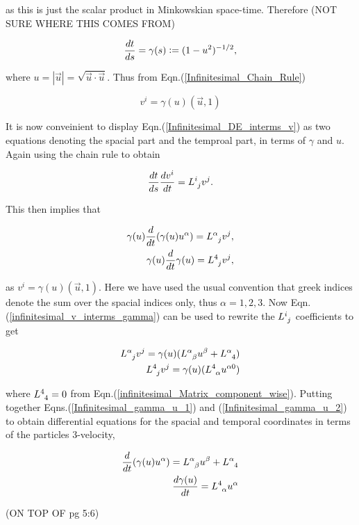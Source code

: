 \noindent as this is just the scalar product in Minkowskian space-time. Therefore (NOT SURE WHERE THIS COMES FROM)

\begin{equation*}
\frac{dt}{ds} = \gamma (s) \vcentcolon = (1-u^2)^{-1/2},
\end{equation*}

\noindent where $u = |\vec{u}| = \sqrt{\vec{u} \cdot \vec{u}}$. Thus from Eqn.(\ref{Infinitesimal_Chain_Rule})

\begin{equation}\label{infinitesimal_v_interms_gamma}
v^i = \gamma(u) (\vec{u}, 1)
\end{equation}

\noindent It is now conveinient to display Eqn.(\ref{Infinitesimal_DE_interms_v}) as two equations denoting the spacial part and the temproal part, in terms of $\gamma$ and $u$. Again using the chain rule to obtain

\begin{equation*} 
\frac{dt}{ds} \frac{dv^i}{dt} = \tensor{L}{^{i}_{j}}v^j. 
\end{equation*} 

\noindent This then implies that 

\begin{eqnarray}\label{Infinitesimal_gamma_u_1}
\gamma(u) \frac{d}{dt} (\gamma(u) u^{\alpha}) = \tensor{L}{^{\alpha}_{j}} v^j, \\\nonumber
\gamma(u) \frac{d}{dt} \gamma(u) = \tensor{L}{^{4}_{j}} v^j,
\end{eqnarray}

\noindent as $v^i = \gamma(u)(\vec{u},1)$. Here we have used the usual convention that greek indices denote the sum over the spacial indices only, thus $\alpha = 1,2,3$. Now Eqn.(\ref{infinitesimal_v_interms_gamma}) can be used to rewrite the $\tensor{L}{^{i}_{j}}$ coefficients to get

\begin{eqnarray}\label{Infinitesimal_gamma_u_2}
\tensor{L}{^{\alpha}_{j}} v^j = \gamma(u) (\tensor{L}{^{\alpha}_{\beta}} u^{\beta} + \tensor{L}{^{\alpha}_4}) \\ \nonumber
\tensor{L}{^{4}_{j}} v^j = \gamma(u) (\tensor{L}{^{4}_{\alpha}} u^{\alpha0})
\end{eqnarray} 

\noindent where $\tensor{L}{^{4}_{4}} = 0$ from Eqn.(\ref{infinitesimal_Matrix_component_wise}). Putting together Eqns.(\ref{Infinitesimal_gamma_u_1}) and (\ref{Infinitesimal_gamma_u_2}) to obtain differential equations for the spacial and temporal coordinates in terms of the particles $3$-velocity,

\begin{eqnarray*} 
\frac{d}{dt} (\gamma(u) u^{\alpha}) = \tensor{L}{^{\alpha}_{\beta}} u^{\beta} + \tensor{L}{^{\alpha}_{4}} \\
\frac{d\gamma(u)}{dt} = \tensor{L}{^{4}_{\alpha}} u^{\alpha}
\end{eqnarray*} 

(ON TOP OF pg 5:6)




 








